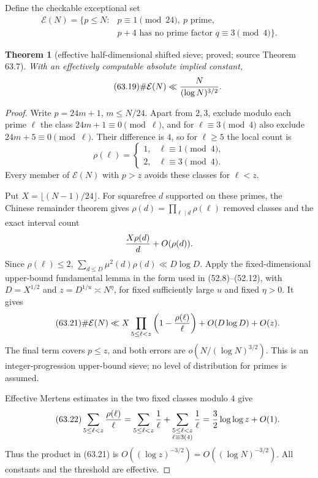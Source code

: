 \documentclass[10pt,reqno]{amsart}
\newtheorem{theorem}{Theorem}[section]
\theoremstyle{definition}
\newcommand{\1}{\mathbf 1}
\begin{document}
Define the checkable exceptional set
\begin{equation}\tag{63.18}
 \begin{split}
 \mathcal E(N)=\{p\leq N:{}&p\equiv1\pmod {24},\ p\text{ prime},\\
                  &p+4\text{ has no prime factor }q\equiv3\pmod4\}.
 \end{split}
\end{equation}
\begin{theorem}[effective half-dimensional shifted sieve; proved; source Theorem 63.7]
\label{thm:half-dimensional-shifted-sieve}
With an effectively computable absolute implied constant,
\begin{equation}\tag{63.19}
                         \#\mathcal E(N)\ll{N\over(\log N)^{3/2}}.
\end{equation}
\end{theorem}
\begin{proof}
Write $p=24m+1$, $m\leq N/24$.  Apart from $2,3$, exclude modulo each prime
$\ell$ the class $24m+1\equiv0\pmod\ell$, and for
$\ell\equiv3\pmod4$ also exclude $24m+5\equiv0\pmod\ell$.  Their
difference is $4$, so for $\ell\geq5$ the local count is
\begin{equation}\tag{63.20}
 \rho(\ell)=\begin{cases}1,&\ell\equiv1\pmod4,\\
                          2,&\ell\equiv3\pmod4.
             \end{cases}
\end{equation}
Every member of $\mathcal E(N)$ with $p>z$ avoids these classes for
$\ell<z$.

Put $X=\lfloor(N-1)/24\rfloor$.  For squarefree $d$ supported on these
primes, the Chinese remainder theorem gives $\rho(d)=\prod_{\ell\mid d}
\rho(\ell)$ removed classes and the exact interval count
\[
 {X\rho(d)\over d}+O(\rho(d)).
\]
Since $\rho(\ell)\leq2$,
$\sum_{d\leq D}\mu^2(d)\rho(d)\ll D\log D$.  Apply the fixed-dimensional
upper-bound fundamental lemma in the form used in (52.8)--(52.12), with
$D=X^{1/2}$ and $z=D^{1/u}\asymp N^\eta$, for fixed sufficiently large
$u$ and fixed $\eta>0$.  It gives
\begin{equation}\tag{63.21}
 \#\mathcal E(N)\ll
 X\prod_{5\leq\ell<z}\left(1-{\rho(\ell)\over\ell}\right)
 +O(D\log D)+O(z).
\end{equation}
The final term covers $p\leq z$, and both errors are
$o(N/(\log N)^{3/2})$.  This is an integer-progression upper-bound sieve;
no level of distribution for primes is assumed.

Effective Mertens estimates in the two fixed classes modulo $4$ give
\begin{equation}\tag{63.22}
 \sum_{5\leq\ell<z}{\rho(\ell)\over\ell}
 =\sum_{5\leq\ell<z}{1\over\ell}
 +\sum_{\substack{5\leq\ell<z\\\ell\equiv3(4)}}{1\over\ell}
 ={3\over2}\log\log z+O(1).
\end{equation}
Thus the product in (63.21) is
$O((\log z)^{-3/2})=O((\log N)^{-3/2})$.  All constants and the threshold
are effective.
\end{proof}
\end{document}

